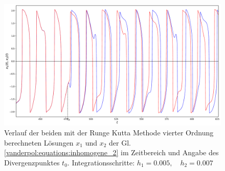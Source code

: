 \begin{figure}
\includegraphics[width=\textwidth]{papers/vanderpol/figures/RK_schritt_delta_2e-3.pdf}
\caption{Verlauf der beiden mit der Runge Kutta Methode vierter Ordnung berechneten Lösungen $x_1$ und $x_2$ der Gl. \ref{vanderpol:equations:inhomogene_2} im Zeitbereich und Angabe des Divergenzpunktes $t_0$. Integrationsschritte: $h_1 = 0.005, \quad h_2 = 0.007$\label{vanderpol:figures:RK_schritt_2e-3_2}}
\end{figure}

